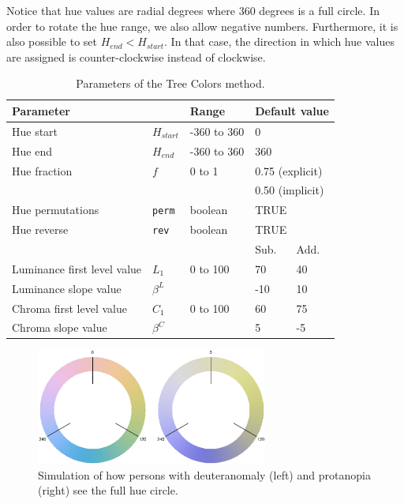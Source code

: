 \documentclass[journal]{vgtc}                %
\begin{document}
Notice that hue values are radial degrees where 360 degrees is a full circle. In order to rotate the hue range, we also allow negative numbers. Furthermore, it is also possible to set $H_{end} < H_{start}$. In that case, the direction in which hue values are assigned is counter-clockwise instead of clockwise.

\begin{table}[!htb]
\begin{footnotesize}
\begin{center}
\begin{tabular}{lllll}
\toprule
\multicolumn{2}{l}{Parameter    } & Range & \multicolumn{2}{l}{Default value} \\
\midrule
Hue start 				& $H_{start}$ &-360 to 360  & \multicolumn{2}{l}{0}      \\
Hue end   				& $H_{end}$ & -360 to 360 & \multicolumn{2}{l}{360}       \\
Hue fraction 				& $f$	& 0 to 1 & \multicolumn{2}{l}{0.75 (explicit)} \\
					&	&	 & \multicolumn{2}{l}{0.50 (implicit)} \\
Hue permutations 			& \texttt{perm} & boolean & \multicolumn{2}{l}{TRUE}      \\
Hue reverse   			& \texttt{rev} & boolean  & \multicolumn{2}{l}{TRUE}    \\
\cmidrule(r){4-5}
					&		&		& Sub. & Add. \\
\cmidrule(r){4-5}
Luminance first level value 	& $L_1$	& 0 to 100  & 70 & 40      \\
Luminance slope value 		& $\beta^L$ &       & -10  & 10      \\
Chroma first level value 		& $C_1$ &  0 to 100  & 60   & 75    \\
Chroma slope value 		& $\beta^C$ &     & 5   & -5    \\
\bottomrule
\end{tabular}
\end{center}
\end{footnotesize}
\caption{Parameters of the Tree Colors method.}\label{table:param}
\end{table}

\begin{figure}[!b]
  \centering
 \includegraphics[width=3in]{hcl_deuteranomaly_protanopia.png}
  \caption{Simulation of how persons with deuteranomaly (left) and protanopia (right) see the full hue circle.}\label{fig:colblind}
\end{figure}
\end{document}
